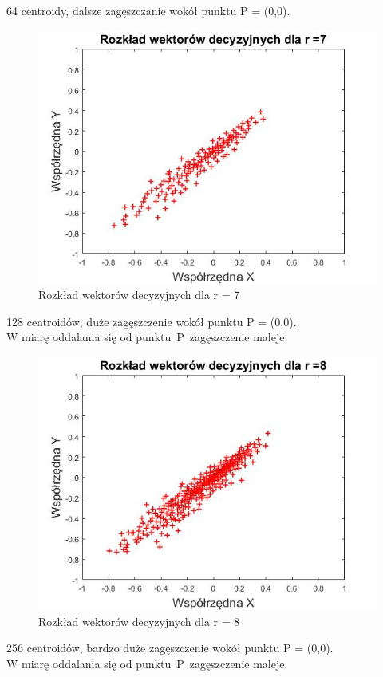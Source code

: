 \documentclass[12pt, a4paper, oneside]{article}
\begin{document}
\begin{center}
64 centroidy, dalsze zagęszczanie wokół punktu P = (0,0).
\end{center}
\clearpage
\begin{figure}[h!]
\centering
\caption{Rozkład wektorów decyzyjnych dla r = 7}
\includegraphics[scale=0.65]{pics/f7}
\end{figure}
\begin{center}
128 centroidów, duże zagęszczenie wokół punktu P = (0,0).\\W miarę oddalania się od punktu~P~zagęszczenie maleje.
\end{center}
\begin{figure}[h!]
\centering
\caption{Rozkład wektorów decyzyjnych dla r = 8}
\includegraphics[scale=0.65]{pics/f8}
\end{figure}
\begin{center}
256 centroidów, bardzo duże zagęszczenie wokół punktu P = (0,0).\\W miarę oddalania się od punktu~P~zagęszczenie maleje.
\end{center}
\clearpage
\end{document}
